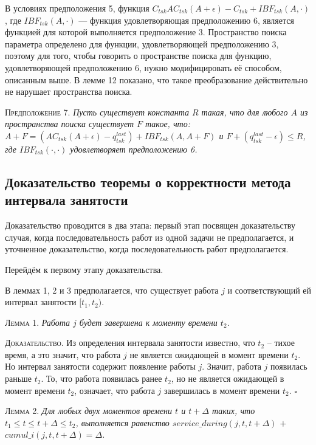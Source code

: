 \documentclass[14pt]{matmex-diploma-custom}
\begin{document}
В условиях предположения 5, функция $C_{tsk}AC_{tsk}(A + \epsilon) - C_{tsk} + IBF_{tsk}(A, \cdot)$,
  где $IBF_{tsk}(A, \cdot)$ --- функция удовлетворяющая предположению 6, 
  является функцией для которой выполняется предположение 3. 
  Пространство поиска параметра определено для функции, удовлетворяющей предположению 3, 
  поэтому для того, чтобы говорить о пространстве поиска для функцию, удовлетворяющей 
  предположению 6, нужно модифицировать её способом, описанным выше.
  В лемме 12 показано, что такое преобразование действительно не нарушает пространства поиска. 
  
\textsc{Предположение 7.}
\textit{Пусть существует константа $R$ такая, что для любого $A$ из пространства 
  поиска существует $F$ такое, что: 
  $A + F = (AC_{tsk}(A + \epsilon) - q_{tsk}^{last}) + IBF_{tsk}(A, A + F)$ и $F + (q_{tsk}^{last} - \epsilon) \leq R$, 
  где $IBF_{tsk}(\cdot, \cdot)$ удовлетворяет предположению 6. } 


\subsection{Доказательство теоремы о корректности метода интервала занятости}

Доказательство проводится в два этапа: первый этап посвящен доказательству случая, когда последовательность 
  работ из одной задачи не предполагается, и уточненное доказательство, когда последовательность
  работ предполагается. 
  
Перейдём к первому этапу доказательства.
  
В леммах 1, 2 и 3  предполагается, что существует работа $j$ и соответствующий ей интервал занятости $[t_1, t_2)$.

\textsc{Лемма 1. }
\textit{Работа $j$ будет завершена к моменту времени $t_2$. }

\textsc{Доказательство.}
  Из определения интервала занятости известно, что $t_2$ -- тихое время, а это  
    значит, что работа $j$ не является ожидающей в момент времени $t_2$. 
    Но интервал занятости содержит появление работы $j$. Значит, работа $j$ 
    появилась раньше $t_2$. То, что работа появилась ранее $t_2$,
    но не является ожидающей в момент времени $t_2$, означает, что работа $j$ 
    завершилась в момент времени $t_2$.
$\square$

\textsc{Лемма 2. }
\textit{Для любых двух моментов времени $t$ и $t + \Delta$ таких, что $t_1 \leq t \leq t + \Delta \leq t_2$, выполняется равенство $service\_during (j, t, t + \Delta)$ $+$ $cumul\_i(j, t, t + \Delta) = \Delta$. }
\end{document}
